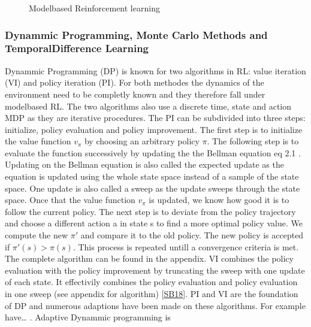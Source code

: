 \documentclass[letterpaper,10pt,english]{jupyterBook}
\let\sphinxpxdimen\pdfpxdimen\else\newdimen\sphinxpxdimen
\begin{document}
\begin{figure}[htbp]
\centering
\capstart

\noindent\sphinxincludegraphics[width=400\sphinxpxdimen,height=300\sphinxpxdimen]{{model_based_RL}.png}
\caption{Model\sphinxhyphen{}based Reinforcement learning}\label{\detokenize{Reinforcement_learning:id25}}\end{figure}


\subsubsection{Dynammic Programming, Monte Carlo Methods and Temporal\sphinxhyphen{}Difference Learning}
\label{\detokenize{Reinforcement_learning:dynammic-programming-monte-carlo-methods-and-temporal-difference-learning}}
\sphinxAtStartPar
Dynammic Programming (DP) is known for two algorithms in RL: value iteration (VI) and policy iteration (PI). For both methodes the dynamics of the environment need to be completly known and they therefore fall under model\sphinxhyphen{}based RL. The two algorithms also use a discrete time, state and action MDP as they are iterative procedures. The PI can be subdivided into three steps: initialize, policy evaluation and policy improvement. The first step is to initialize the value function \(v_{\pi}\) by choosing an arbitrary policy \(\pi\). The following step is to evaluate the function successively by updating the the Bellman equation eq 2.1 . Updating on the Bellman equation is also called the expected update as the equation is updated using the whole state space instead of a sample of the state space. One update is also called a sweep as the update sweeps through the state space. Once that the value function \(v_{\pi}\) is updated, we know how good it is to follow the current policy. The next step is to deviate from the policy trajectory and choose a different action a in state s to find a more optimal policy value. We compute the new \(\pi '\) and compare it to the old policy. The new policy is accepted if \(\pi '(s) > \pi(s)\). This process is repeated untill a convergence criteria is met. The complete algorithm can be found in the appendix. VI combines the policy evaluation with the policy improvement by truncating the sweep with one update of each state. It effectivily combines the policy evaluation and policy evaluation in one sweep (see appendix for algorithm) {[}\hyperlink{cite.Financial_application:id70}{SB18}{]}. PI and VI are the foundation of DP and numerous adaptions have been made on these algorithms. For example have… . Adaptive Dynammic programming is
\end{document}
